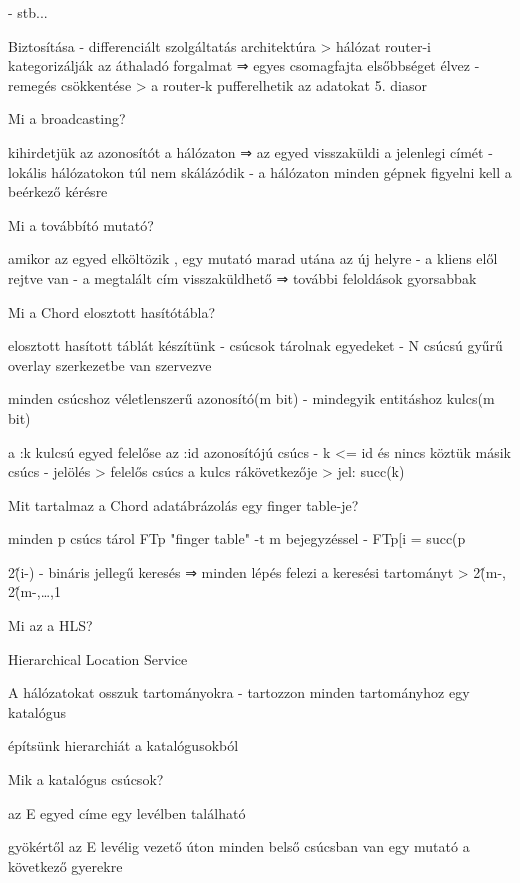 \documentclass[12pt]{article}
\begin{document}
\begin{description}
        - stb...
    \item Biztosítása
        - differenciált szolgáltatás architektúra
        > hálózat router-i kategorizálják az áthaladó forgalmat 
        ⇒ egyes csomagfajta elsőbbséget élvez
        - remegés csökkentése
        > a router-k pufferelhetik az adatokat
        5. diasor
    \item  Mi a broadcasting?
    \item kihirdetjük az azonosítót a hálózaton ⇒ az egyed visszaküldi a jelenlegi címét
        - lokális hálózatokon túl nem skálázódik
        - a hálózaton minden gépnek figyelni kell a beérkező kérésre 
    \item  Mi a továbbító mutató?
    \item amikor az egyed elköltözik , egy mutató marad utána az új helyre
        - a kliens elől rejtve van
        - a megtalált cím visszaküldhető ⇒ további feloldások gyorsabbak
    \item  Mi a Chord elosztott hasítótábla?
    \item elosztott hasított táblát készítünk
        - csúcsok tárolnak egyedeket
        - N csúcsú gyűrű overlay szerkezetbe van szervezve
    \item minden csúcshoz véletlenszerű azonosító(m bit)
        - mindegyik entitáshoz kulcs(m bit)
    \item a :k kulcsú egyed felelőse az :id azonosítójú csúcs
        - k <= id és nincs köztük másik csúcs
        - jelölés
        > felelős csúcs a kulcs rákövetkezője
        > jel: succ(k)
    \item  Mit tartalmaz a Chord adatábrázolás egy finger table-je?
    \item minden p csúcs tárol FTp "finger table" -t m bejegyzéssel
        - FTp[i = succ(p\item2\^(i-)
        - bináris jellegű keresés ⇒ minden lépés felezi a keresési tartományt
        > 2\^(m-, 2\^(m-,\ldots,1
    \item  Mi az a HLS?
    \item Hierarchical Location Service
    \item A hálózatokat osszuk tartományokra
        - tartozzon minden tartományhoz egy katalógus
    \item építsünk hierarchiát a katalógusokból
    \item  Mik a katalógus csúcsok?
    \item az E egyed címe egy levélben található
    \item gyökértől az E levélig vezető úton minden belső csúcsban van egy mutató a következő gyerekre

\end{description}
\end{document}
